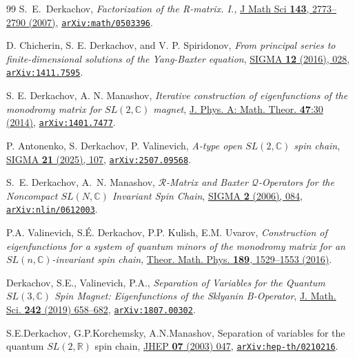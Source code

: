 \documentclass[a4paper,11pt]{article}
\numberwithin{equation}{section}
\begin{document}
\begin{thebibliography}{99}
S.~E.~Derkachov,
\emph{ Factorization of the R-matrix. I.,}
\href{https://link.springer.com/article/10.1007/s10958-007-0164-8#citeas}{J Math Sci \textbf{143}, 2773–2790 (2007)},
\href{https://doi.org/10.48550/arXiv.math/0503396}{\texttt{arXiv:math/0503396}}.

 D. Chicherin, S. E. Derkachov, and V. P. Spiridonov, {\em
	From principal series to finite-dimensional solutions of the Yang-Baxter equation},
\href{https://www.emis.de/journals/SIGMA/2016/028/}{SIGMA {\bf 12} (2016), 028},
\href{https://arxiv.org/abs/1411.7595v4}{\href{https://arxiv.org/abs/1411.7595}{\texttt{arXiv:1411.7595}}}.

 S. E. Derkachov, A. N. Manashov, \textit{Iterative construction of eigenfunctions of the monodromy matrix for $SL(2,\mathbb{C})$ magnet}, \href{https://doi.org/10.1088/1751-8113/47/30/305204}{J. Phys. A: Math. Theor. \textbf{47}:30 (2014)}, \href{https://arxiv.org/abs/1401.7477}{\texttt{arXiv:1401.7477}}.

P. Antonenko, S. Derkachov, P. Valinevich,
\textit{A-type open $SL(2,\mathbb{C})$ spin chain},
\href{https://sigma-journal.com/2025/107/}{SIGMA \textbf{21} (2025), 107},
\href{https://arxiv.org/abs/2507.09568}{\texttt{arXiv:2507.09568}}.

S.~E. Derkachov, A.~N. Manashov, \textit{$\mathcal{R}$-Matrix and Baxter $\mathcal{Q}$-Operators for the Noncompact $SL(N,\mathbb{C})$ Invariant Spin Chain}, \href{https://sigma-journal.com/2006/Paper084/}{SIGMA \textbf{2} (2006), 084},	\href{https://arxiv.org/abs/nlin/0612003v1}{\texttt{arXiv:nlin/0612003}}.

P.A. Valinevich, S.\'E. Derkachov, P.P. Kulish, E.M. Uvarov,
\textit{Construction of eigenfunctions for a system of quantum minors of the monodromy matrix for an $SL(n,\mathbb{C})$-invariant spin chain},
\href{https://link.springer.com/article/10.1134/S0040577916110015}{Theor. Math. Phys. \textbf{189}, 1529–1553 (2016)}.

Derkachov, S.E., Valinevich, P.A.,
\textit{Separation of Variables for the Quantum $SL(3,\mathbb{C})$ Spin Magnet: Eigenfunctions of the Sklyanin B-Operator}, 
\href{https://doi.org/10.1007/s10958-019-04415-0}{J. Math. Sci. \textbf{242} (2019) 658--682}, \href{https://arxiv.org/abs/1807.00302v2}{\tt arXiv:1807.00302}.


S.E.Derkachov, G.P.Korchemsky, A.N.Manashov, Separation of variables for the quantum $SL(2,\mathbb{R})$ spin chain,
\href{https://doi.org/10.1088/1126-6708/2003/07/047}{JHEP \textbf{07} (2003) 047}, \href{https://arxiv.org/abs/hep-th/0210216}{\texttt{arXiv:hep-th/0210216}}.


\end{thebibliography}
\end{document}
